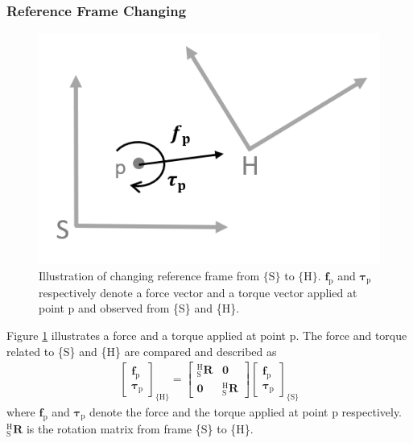 \subsubsection{Reference Frame Changing}
\begin{figure}[htbp]
\begin{center}
\includegraphics[width=0.6\linewidth]{Images/sensor_comp 1.png}
\caption{
Illustration of changing reference frame from $\{\mathrm{S}\} $ to $\{\mathrm{H}\}$. $\boldsymbol{f}_\mathrm{p}$ and $\boldsymbol{\tau}_\mathrm{p}$ respectively denote a force vector and a torque vector applied at point p and observed from \{S\} and \{H\}.
}\label{fig:sensor_comp1}
\end{center}
\end{figure}
\par\noindent
\hspace{6mm}Figure \ref{fig:sensor_comp1} illustrates a force and a torque applied at point p. The force and torque related to \{S\} and \{H\} are compared and described as   
\begin{equation}
\begin{split}
\begin{bmatrix}
\boldsymbol{f}_\mathrm{p}\\ 
\boldsymbol{\tau}_\mathrm{p}
\end{bmatrix}
_{\{ \mathrm{H}\}}
=
\begin{bmatrix}
_\mathrm{S}^\mathrm{H}\mathbf{R} & \boldsymbol{0}\\ 
\boldsymbol{0} & _\mathrm{S}^\mathrm{H}\mathbf{R}
\end{bmatrix}
\begin{bmatrix}
\boldsymbol{f}_\mathrm{p}\\ 
\boldsymbol{\tau}_\mathrm{p}
\end{bmatrix}
_{\{ \mathrm{S}\}}
\end{split}
\end{equation}
where $\boldsymbol{f}_\mathrm{p}$ and $\boldsymbol{\tau}_\mathrm{p}$ denote the force and the torque applied at point p respectively. $_\mathrm{S}^\mathrm{H}\mathbf{R}$ is the rotation matrix from frame \{S\} to \{H\}.
